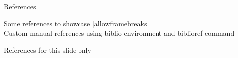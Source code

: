 \documentclass[10pt,aspectratio=169]{beamer} %
\begin{document}
\begin{frame}{References}

  Some references to showcase [allowframebreaks] \cite{knuth92,ConcreteMath,Simpson,Er01,greenwade93}\\
 
  
  Custom manual references using biblio environment and biblioref command 

  \begin{biblio}{References for this slide only}
  \end{biblio}

\end{frame}
\end{document}
